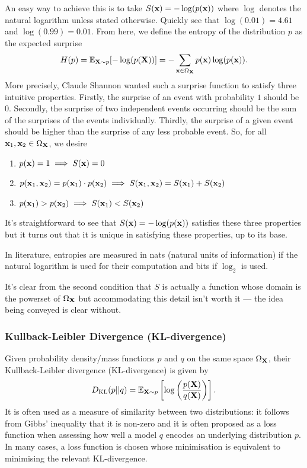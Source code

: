 \documentclass[11pt]{article}
\begin{document}
\begin{appendices}
An easy way to achieve this is to take $S(\mathbf{x})=-\log(p(\mathbf{x}))$ where $\log$ denotes the natural logarithm unless stated otherwise. Quickly see that $\log(0.01)=4.61$ and $\log(0.99)=0.01$. From here, we define the entropy of the distribution $p$ as the expected surprise
$$
H(p)
=
\mathbb{E}_{\mathbf{X}\sim p}[-\log(p(\mathbf{X}))]
=
-\sum_{\mathbf{x}\in \Omega_{\mathbf{X}}}p(\mathbf{x})\log(p(\mathbf{x})).
$$
More precisely, Claude Shannon wanted such a surprise function to satisfy three intuitive properties. Firstly, the surprise of an event with probability $1$ should be $0$. Secondly, the surprise of two independent events occurring should be the sum of the surprises of the events individually. Thirdly, the surprise of a given event should be higher than the surprise of any less probable event. So, for all $\mathbf{x}_1,\mathbf{x}_2\in\Omega_{\mathbf{X}}$, we desire
\begin{enumerate}
    \item $p(\mathbf{x})=1\implies S(\mathbf{x})=0$
    \item $p(\mathbf{x}_1,\mathbf{x}_2)=p(\mathbf{x}_1)\cdot p(\mathbf{x}_2)\implies S(\mathbf{x}_1,\mathbf{x}_2)=S(\mathbf{x}_1)+S(\mathbf{x}_2)$
    \item $p(\mathbf{x}_1)>p(\mathbf{x}_2)\implies S(\mathbf{x}_1)<S(\mathbf{x}_2)$
\end{enumerate}
It's straightforward to see that $S(\mathbf{x})=-\log(p(\mathbf{x}))$ satisfies these three properties but it turns out that it is unique in satisfying these properties, up to its base.

In literature, entropies are measured in nats (natural units of information) if the natural logarithm is used for their computation and bits if $\log_2$ is used.

\begin{tcolorbox}[title={\centering\textbf{Technical note regarding} $\text{dom}(S)$}, colback=myLightBlue, colbacktitle=myDarkBlue, colframe=myDarkBlue, coltitle=white]
    It's clear from the second condition that $S$ is actually a function whose domain is the powerset of $\Omega_{\mathbf{X}}$ but accommodating this detail isn't worth it — the idea being conveyed is clear without.
\end{tcolorbox}

\subsubsection{Kullback-Leibler Divergence (KL-divergence)}

Given probability density/mass functions $p$ and $q$ on the same space $\Omega_{\mathbf{X}}$, their Kullback-Leibler divergence (KL-divergence) is given by
$$
D_{\text{KL}}(p||q)
=
\mathbb{E}_{\mathbf{X}\sim p}\left[\log\left(\frac{p(\mathbf{X})}{q(\mathbf{X})}\right)\right].
$$
It is often used as a measure of similarity between two distributions: it follows from Gibbs' inequality that it is non-zero and it is often proposed as a loss function when assessing how well a model $q$ encodes an underlying distribution $p$. In many cases, a loss function is chosen whose minimisation is equivalent to minimising the relevant KL-divergence.


\end{appendices}
\end{document}
